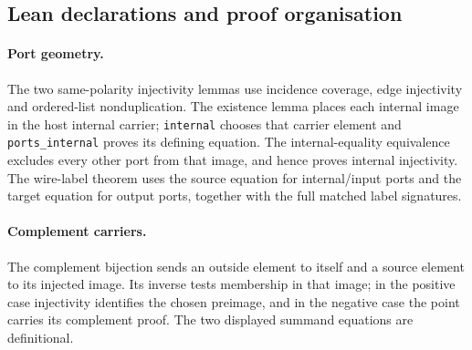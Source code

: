 \subsection{Lean declarations and proof organisation}
\paragraph{Port geometry.}
The two same-polarity injectivity lemmas use incidence coverage, edge
injectivity and ordered-list nonduplication. The existence lemma places each
internal image in the host internal carrier; \texttt{internal} chooses that
carrier element and \texttt{ports\_internal} proves its defining equation.
The internal-equality equivalence excludes every other port from that image,
and hence proves internal injectivity. The wire-label theorem uses the
source equation for internal/input ports and the target equation for output
ports, together with the full matched label signatures.

\par{}

\paragraph{Complement carriers.}
The complement bijection sends an outside element to itself and a source
element to its injected image. Its inverse tests membership in that image;
in the positive case injectivity identifies the chosen preimage, and in the
negative case the point carries its complement proof. The two displayed
summand equations are definitional.


